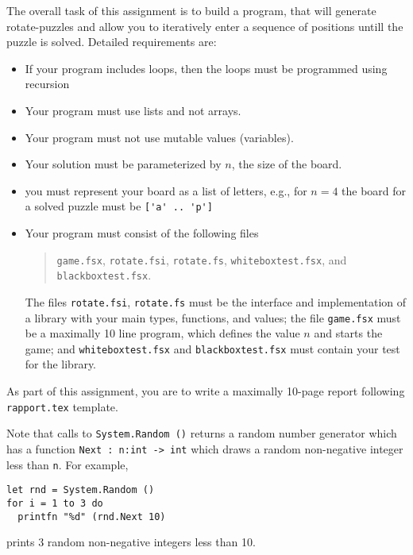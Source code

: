 The overall task of this assignment is to build a program, that will generate rotate-puzzles and allow you to iteratively enter a sequence of positions untill the puzzle is solved. Detailed requirements are:
\begin{itemize}
\item If your program includes loops, then the loops must be programmed using recursion
\item Your program must use lists and not arrays.
\item Your program must not use mutable values (variables).
\item Your solution must be parameterized by $n$, the size of the board.
\item you must represent your board as a list of letters, e.g., for $n=4$ the board for a solved puzzle must be \lstinline{['a' .. 'p']}
\item Your program must consist of the following files
\begin{quote}
\lstinline{game.fsx}, \lstinline{rotate.fsi}, \lstinline{rotate.fs}, \lstinline{whiteboxtest.fsx}, and \lstinline{blackboxtest.fsx}.
\end{quote}
The files \lstinline{rotate.fsi}, \lstinline{rotate.fs} must be the interface and implementation of a library with your main types, functions, and values; the file \lstinline{game.fsx} must be a maximally 10 line program, which defines the value $n$ and starts the game; and \lstinline{whiteboxtest.fsx} and \lstinline{blackboxtest.fsx} must contain your test for the library.
\end{itemize}
As part of this assignment, you are to write a maximally 10-page report following \lstinline{rapport.tex} template.

Note that calls to \lstinline{System.Random ()} returns a random number generator which has a function \lstinline{Next : n:int -> int} which draws a random non-negative integer less than \lstinline{n}. For example,
\begin{lstlisting}
let rnd = System.Random ()
for i = 1 to 3 do             
  printfn "%d" (rnd.Next 10)
\end{lstlisting}
prints 3 random non-negative integers less than 10.
